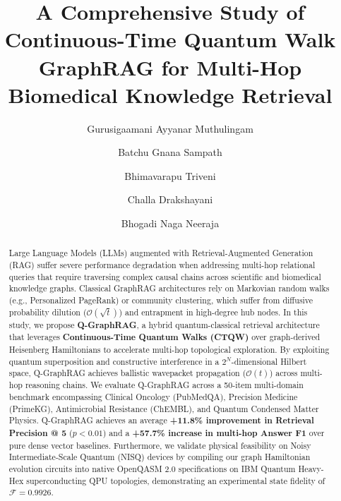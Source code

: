 \documentclass[runningheads]{llncs}
\begin{document}
\title{A Comprehensive Study of Continuous-Time Quantum Walk GraphRAG for Multi-Hop Biomedical Knowledge Retrieval}

\author{Gurusigaamani Ayyanar Muthulingam\and
Batchu Gnana Sampath\and
Bhimavarapu Triveni\and
Challa Drakshayani\and
Bhogadi Naga Neeraja}



\maketitle

\begin{abstract}
Large Language Models (LLMs) augmented with Retrieval-Augmented Generation (RAG) suffer severe performance degradation when addressing multi-hop relational queries that require traversing complex causal chains across scientific and biomedical knowledge graphs. Classical GraphRAG architectures rely on Markovian random walks (e.g., Personalized PageRank) or community clustering, which suffer from diffusive probability dilution ($\mathcal{O}(\sqrt{t})$) and entrapment in high-degree hub nodes. In this study, we propose \textbf{Q-GraphRAG}, a hybrid quantum-classical retrieval architecture that leverages \textbf{Continuous-Time Quantum Walks (CTQW)} over graph-derived Heisenberg Hamiltonians to accelerate multi-hop topological exploration. By exploiting quantum superposition and constructive interference in a $2^N$-dimensional Hilbert space, Q-GraphRAG achieves ballistic wavepacket propagation ($\mathcal{O}(t)$) across multi-hop reasoning chains. We evaluate Q-GraphRAG across a 50-item multi-domain benchmark encompassing Clinical Oncology (PubMedQA), Precision Medicine (PrimeKG), Antimicrobial Resistance (ChEMBL), and Quantum Condensed Matter Physics. Q-GraphRAG achieves an average \textbf{+11.8\% improvement in Retrieval Precision @ 5} ($p < 0.01$) and a \textbf{+57.7\% increase in multi-hop Answer F1} over pure dense vector baselines. Furthermore, we validate physical feasibility on Noisy Intermediate-Scale Quantum (NISQ) devices by compiling our graph Hamiltonian evolution circuits into native OpenQASM 2.0 specifications on IBM Quantum Heavy-Hex superconducting QPU topologies, demonstrating an experimental state fidelity of $\mathcal{F} = 0.9926$.

\end{abstract}
\end{document}
